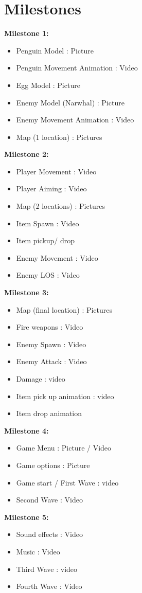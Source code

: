 \documentclass{article}
\begin{document}
\section{Milestones}
\begin{adjustwidth}{2.5em}{0pt}
\textbf{\large Milestone 1:}
\begin{itemize}
\item Penguin Model : Picture
\item Penguin Movement Animation : Video
\item Egg Model : Picture
\item Enemy Model (Narwhal) : Picture
\item Enemy Movement Animation : Video
\item Map (1 location) : Pictures
\end{itemize}
\textbf{\large Milestone 2:}
\begin{itemize}
\item Player Movement : Video
\item Player Aiming : Video
\item Map (2 locations) : Pictures
\item Item Spawn : Video
\item Item pickup/ drop
\item Enemy Movement : Video
\item Enemy LOS : Video
\end{itemize}
\textbf{\large Milestone 3:}
\begin{itemize}
\item Map (final location) : Pictures
\item Fire weapons : Video
\item Enemy Spawn : Video
\item Enemy Attack : Video
\item Damage : video
\item Item pick up animation : video
\item Item drop animation
\end{itemize}
\textbf{\large Milestone 4:}
\begin{itemize}
\item Game Menu : Picture / Video
\item Game options : Picture
\item Game start / First Wave : video
\item Second Wave : Video
\end{itemize}
\textbf{\large Milestone 5:}
\begin{itemize}
\item Sound effects : Video
\item Music : Video
\item Third Wave : video
\item Fourth Wave : Video
\end{itemize}
\end{adjustwidth}
\end{document}
